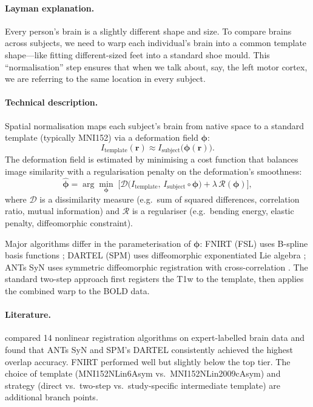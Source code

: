 \documentclass[11pt,a4paper]{article}
\begin{document}
\paragraph{Layman explanation.}
Every person's brain is a slightly different shape and size.  To compare brains across subjects, we need to warp each individual's brain into a common template shape---like fitting different-sized feet into a standard shoe mould.  This ``normalisation'' step ensures that when we talk about, say, the left motor cortex, we are referring to the same location in every subject.

\paragraph{Technical description.}
Spatial normalisation maps each subject's brain from native space to a standard template (typically MNI152) via a deformation field $\boldsymbol\phi$:
\begin{equation}
    I_{\mathrm{template}}(\mathbf{r}) \approx I_{\mathrm{subject}}\!\bigl(\boldsymbol\phi(\mathbf{r})\bigr).
\end{equation}
The deformation field is estimated by minimising a cost function that balances image similarity with a regularisation penalty on the deformation's smoothness:
\begin{equation}
    \hat{\boldsymbol\phi} = \arg\min_{\boldsymbol\phi} \;\bigl[\mathcal{D}\!\bigl(I_{\mathrm{template}},\, I_{\mathrm{subject}} \circ \boldsymbol\phi\bigr) + \lambda\,\mathcal{R}(\boldsymbol\phi)\bigr],
\end{equation}
where $\mathcal{D}$ is a dissimilarity measure (e.g.\ sum of squared differences, correlation ratio, mutual information) and $\mathcal{R}$ is a regulariser (e.g.\ bending energy, elastic penalty, diffeomorphic constraint).

Major algorithms differ in the parameterisation of $\boldsymbol\phi$: FNIRT (FSL) uses B-spline basis functions \citep{andersson2007}; DARTEL (SPM) uses diffeomorphic exponentiated Lie algebra \citep{ashburner2007}; ANTs SyN uses symmetric diffeomorphic registration with cross-correlation \citep{avants2008}.  The standard two-step approach first registers the T1w to the template, then applies the combined warp to the BOLD data.

\paragraph{Literature.}
\citet{klein2009} compared 14 nonlinear registration algorithms on expert-labelled brain data and found that ANTs SyN and SPM's DARTEL consistently achieved the highest overlap accuracy.  FNIRT performed well but slightly below the top tier.  The choice of template (MNI152NLin6Asym vs.\ MNI152NLin2009cAsym) and strategy (direct vs.\ two-step vs.\ study-specific intermediate template) are additional branch points.
\end{document}
